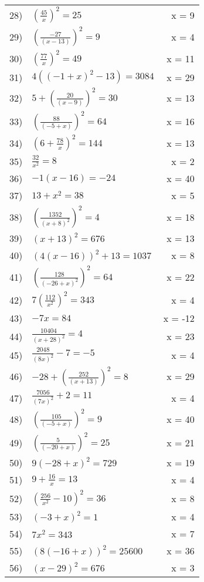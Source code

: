 \documentclass{article}
\begin{document}
\begin{longtable}{l p{} r}
28) & ${ (\frac{ 45 }{ x }) }^2 = 25$ & x = 9 \\ 
29) & ${ (\frac{ -27 }{ (x - 13) }) }^2 = 9$ & x = 4 \\ 
30) & ${ (\frac{ 77 }{ x }) }^2 = 49$ & x = 11 \\ 
31) & $4({ (-1 + x) }^2 - 13) = 3084$ & x = 29 \\ 
32) & $5 + { (\frac{ 20 }{ (x - 9) }) }^2 = 30$ & x = 13 \\ 
33) & ${ (\frac{ 88 }{ (-5 + x) }) }^2 = 64$ & x = 16 \\ 
34) & ${ (6 + \frac{ 78 }{ x }) }^2 = 144$ & x = 13 \\ 
35) & $\frac{ 32 }{ { x }^2 } = 8$ & x = 2 \\ 
36) & $-1(x - 16) = -24$ & x = 40 \\ 
37) & $13 + { x }^2 = 38$ & x = 5 \\ 
38) & ${ (\frac{ 1352 }{ { (x + 8) }^2 }) }^2 = 4$ & x = 18 \\ 
39) & ${ (x + 13) }^2 = 676$ & x = 13 \\ 
40) & ${ (4(x - 16)) }^2 + 13 = 1037$ & x = 8 \\ 
41) & ${ (\frac{ 128 }{ { (-26 + x) }^2 }) }^2 = 64$ & x = 22 \\ 
42) & $7{ (\frac{ 112 }{ { x }^2 }) }^2 = 343$ & x = 4 \\ 
43) & $-7x = 84$ & x = -12 \\ 
44) & $\frac{ 10404 }{ { (x + 28) }^2 } = 4$ & x = 23 \\ 
45) & $\frac{ 2048 }{ { (8x) }^2 } - 7 = -5$ & x = 4 \\ 
46) & $-28 + { (\frac{ 252 }{ (x + 13) }) }^2 = 8$ & x = 29 \\ 
47) & $\frac{ 7056 }{ { (7x) }^2 } + 2 = 11$ & x = 4 \\ 
48) & ${ (\frac{ 105 }{ (-5 + x) }) }^2 = 9$ & x = 40 \\ 
49) & ${ (\frac{ 5 }{ (-20 + x) }) }^2 = 25$ & x = 21 \\ 
50) & $9{ (-28 + x) }^2 = 729$ & x = 19 \\ 
51) & $9 + \frac{ 16 }{ x } = 13$ & x = 4 \\ 
52) & ${ (\frac{ 256 }{ { x }^2 } - 10) }^2 = 36$ & x = 8 \\ 
53) & ${ (-3 + x) }^2 = 1$ & x = 4 \\ 
54) & $7{ x }^2 = 343$ & x = 7 \\ 
55) & ${ (8(-16 + x)) }^2 = 25600$ & x = 36 \\ 
56) & ${ (x - 29) }^2 = 676$ & x = 3 \\ 

\end{longtable}
\end{document}
